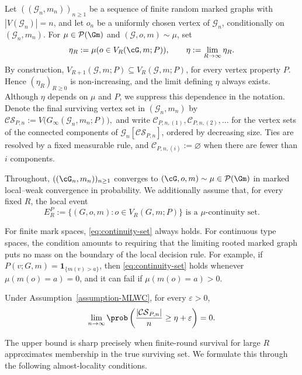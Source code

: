 \documentclass[11pt]{article}
\theoremstyle{plain}
\begin{document}
Let $((\mathcal{G}_n,m_n))_{n\ge1}$ be a sequence of finite random marked graphs with $|V(\mathcal{G}_n)|=n$, and let $o_n$ be a uniformly chosen vertex of $\mathcal{G}_n$, conditionally on $(\mathcal{G}_n,m_n)$. For $\mu\in\mathcal{P}(\Gm)$ and $(\mathcal{G},o,m)\sim\mu$, set
\[
\eta_R:=\mu(o\in V_R(\cG,m;P)),
\qquad
\eta:=\lim_{R\to\infty}\eta_R.
\]
By construction, $V_{R+1}(\mathcal{G},m;P)\subseteq V_R(\mathcal{G},m;P)$, 
for every vertex property $P$. Hence $(\eta_R)_{R\ge0}$ is
non-increasing, and the limit defining $\eta$ always exists.
Although $\eta$ depends on $\mu$ and $P$, we suppress this dependence in the notation.
Denote the final surviving vertex set in $(\mathcal{G}_n,m_n)$ by
\(
\mathcal{CS}_{P,n}:=V\bigl(G_{\infty}(\mathcal{G}_n,m_n;P)\bigr),
\)
and write $\mathcal{C}_{P,n,(1)},\mathcal{C}_{P,n,(2)},\ldots$ for the
vertex sets of the connected components of
$\mathcal{G}_n[\mathcal{CS}_{P,n}]$, ordered by decreasing size. Ties are
resolved by a fixed measurable rule, and $\mathcal C_{P,n,(i)}:=\varnothing$
when there are fewer than $i$ components.
\begin{assumption}\label{assumption-MLWC}
Throughout, $((\cG_n,m_n))_{n\ge1}$ converges to
$(\cG,o,m)\sim\mu\in\mathcal P(\Gm)$ in marked local--weak convergence in
probability. We additionally assume that, for every fixed $R$, the local event
\begin{equation}\label{eq:continuity-set}
    E_R^P:=\{(G,o,m):o\in V_R(G,m;P)\} \text{ is a $\mu$-continuity set.}
\end{equation}
\end{assumption}
For finite mark spaces, \eqref{eq:continuity-set} always holds. For continuous type spaces, the condition amounts to requiring that the limiting rooted marked graph puts no mass on the boundary of the
local decision rule. For example, if $P(v;G,m)=\mathbf 1_{\{m(v)>a\}}$, then \eqref{eq:continuity-set} holds whenever $\mu(m(o)=a)=0$, and it can fail if $\mu(m(o)=a)>0$.


\begin{theorem}\label{thm:upper-bound}
 Under Assumption~\ref{assumption-MLWC}, for every $\varepsilon>0$,
\begin{equation}\label{eq:upper-bound-core}
\lim_{n\to \infty}\prob\left(\frac{|\mathcal{CS}_{P,n}|}{n}\ge\eta+\varepsilon\right) = 0.
\end{equation}
\end{theorem}
The upper bound is sharp precisely when finite-round survival for large $R$ approximates membership in the true surviving set. We formulate this through the following almost-locality conditions.
\end{document}
